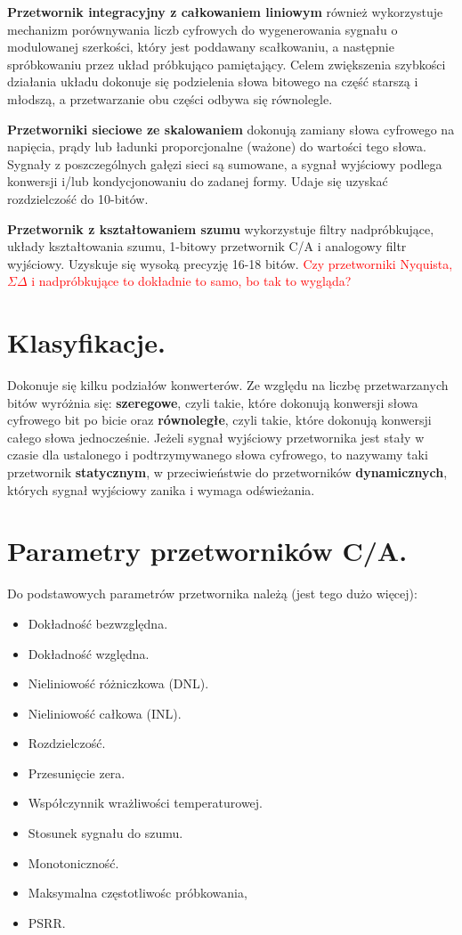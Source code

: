 \documentclass[10pt,a4paper]{report}
\begin{document}
	{	\textbf{Przetwornik integracyjny z całkowaniem liniowym} również wykorzystuje mechanizm porównywania liczb cyfrowych do wygenerowania sygnału o modulowanej szerkości, który jest poddawany scałkowaniu, a następnie spróbkowaniu przez układ próbkująco pamiętający. Celem zwiększenia szybkości działania układu dokonuje się podzielenia słowa bitowego na część starszą i młodszą, a przetwarzanie obu części odbywa się równolegle. }
	
	{	\textbf{Przetworniki sieciowe ze skalowaniem} dokonują zamiany słowa cyfrowego na napięcia, prądy lub ładunki proporcjonalne (ważone) do wartości tego słowa. Sygnały z poszczególnych gałęzi sieci są sumowane, a sygnał wyjściowy podlega konwersji i/lub kondycjonowaniu do zadanej formy. Udaje się uzyskać rozdzielczość do 10-bitów.}
	
	{	\textbf{Przetwornik z kształtowaniem szumu} wykorzystuje filtry nadpróbkujące, układy kształtowania szumu, 1-bitowy przetwornik C/A i analogowy filtr wyjściowy. Uzyskuje się wysoką precyzję 16-18 bitów. \textcolor{red}{Czy przetworniki Nyquista, $\Sigma \Delta$ i nadpróbkujące to dokładnie to samo, bo tak to wygląda?} }
	
	\section{Klasyfikacje.}
	{	Dokonuje się kilku podziałów konwerterów. Ze względu na liczbę przetwarzanych bitów wyróżnia się: \textbf{szeregowe}, czyli takie, które dokonują konwersji słowa cyfrowego bit po bicie oraz \textbf{równoległe}, czyli takie, które dokonują konwersji całego słowa jednocześnie. Jeżeli sygnał wyjściowy przetwornika jest stały w czasie dla ustalonego i podtrzymywanego słowa cyfrowego, to nazywamy taki przetwornik \textbf{statycznym}, w przeciwieństwie do przetworników \textbf{dynamicznych}, których sygnał wyjściowy zanika i wymaga odświeżania. }

	\section{Parametry przetworników C/A.}
	{	Do podstawowych parametrów przetwornika należą (jest tego dużo więcej):
		\begin{itemize}
			\item Dokładność bezwzględna.
			\item Dokładność względna.
			\item Nieliniowość różniczkowa (DNL).
			\item Nieliniowość całkowa (INL). 
			\item Rozdzielczość.
			\item Przesunięcie zera.
			\item Współczynnik wrażliwości temperaturowej.
			\item Stosunek sygnału do szumu.
			\item Monotoniczność.
			\item Maksymalna częstotliwośc próbkowania,
			\item PSRR.
		\end{itemize} 
	}
\end{document}
